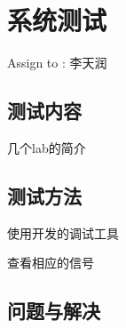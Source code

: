 \section{系统测试}
    Assign to : 李天润

    \subsection{测试内容}
        几个lab的简介

    \subsection{测试方法}
        使用开发的调试工具

        查看相应的信号

    \subsection{问题与解决}
    